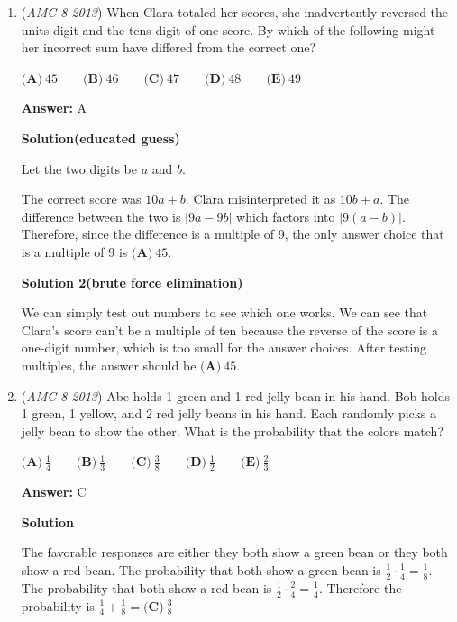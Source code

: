 \begin{enumerate}
 
-JasonDaGoat

 


	\item (\textit{AMC 8 2013}) When Clara totaled her scores, she inadvertently reversed the units digit and the tens digit of one score. By which of the following might her incorrect sum have differed from the correct one?


 $\textbf{(A)}\ 45 \qquad \textbf{(B)}\ 46 \qquad \textbf{(C)}\ 47 \qquad \textbf{(D)}\ 48 \qquad \textbf{(E)}\ 49$

 \textbf{Answer: }A



\textbf{Solution(educated guess)}

Let the two digits be $a$ and $b$.

 The correct score was $10a+b$. Clara misinterpreted it as $10b+a$. The difference between the two is $|9a-9b|$ which factors into $|9(a-b)|$. Therefore, since the difference is a multiple of 9, the only answer choice that is a multiple of 9 is  $\boxed{\textbf{(A)}\ 45}$.

 



\textbf{Solution 2(brute force elimination)}

We can simply test out numbers to see which one works. We can see that Clara’s score can’t be a multiple of ten because the reverse of the score is a one-digit number, which is too small for the answer choices. After testing multiples, the answer should be $\boxed{\textbf{(A)}\ 45}$.

 


	\item (\textit{AMC 8 2013}) Abe holds 1 green and 1 red jelly bean in his hand. Bob holds 1 green, 1 yellow, and 2 red jelly beans in his hand. Each randomly picks a jelly bean to show the other. What is the probability that the colors match?


 $\textbf{(A)}\ \frac14 \qquad \textbf{(B)}\ \frac13 \qquad \textbf{(C)}\ \frac38 \qquad \textbf{(D)}\ \frac12 \qquad \textbf{(E)}\ \frac23$

 \textbf{Answer: }C



\textbf{Solution}

The favorable responses are either they both show a green bean or they both show a red bean. The probability that both show a green bean is $\frac{1}{2}\cdot\frac{1}{4}=\frac{1}{8}$. The probability that both show a red bean is $\frac{1}{2}\cdot\frac{2}{4}=\frac{1}{4}$. Therefore the probability is $\frac{1}{4}+\frac{1}{8}=\boxed{\textbf{(C)}\ \frac{3}{8}}$





\end{enumerate}

